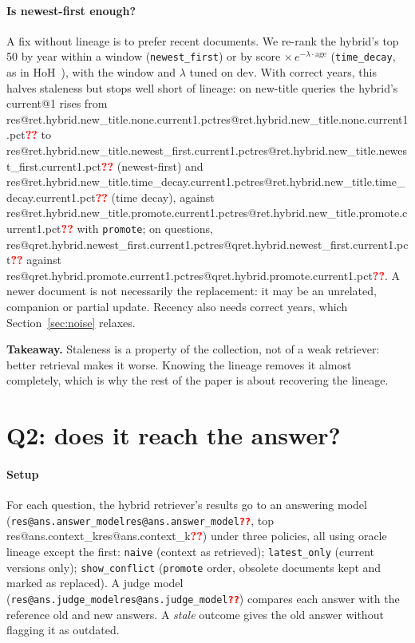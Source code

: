 \documentclass[11pt,a4paper]{article}
\makeatletter
\newcommand{\res}[1]{\ifcsname res@#1\endcsname\csname res@#1\endcsname\else\textcolor{red}{\textbf{??}}\fi}
\newcommand{\code}[1]{\texttt{\small #1}}
\newcommand{\status}[2]{%
  \par\vspace{-0.3em}{\sffamily\footnotesize
  \tcbox[on line,colback=#1!12,colframe=#1!12,boxrule=0pt,arc=6pt,
    left=4pt,right=4pt,top=1pt,bottom=1pt]{\textcolor{#1!70!black}{\textbf{#2}}}}\par\vspace{0.2em}}
\newcommand{\final}[1][final]{\status{aqua}{#1}}
\newcommand{\Takeaway}[1]{\begin{takeaway}\textsf{\textbf{\color{accent}Takeaway.}} #1\end{takeaway}}
\makeatother
\begin{document}
\paragraph{Is newest-first enough?} A fix without lineage is to prefer recent
documents. We re-rank the hybrid's top 50 by year within a window
(\code{newest\_first}) or by score $\times\,e^{-\lambda\cdot\text{age}}$
(\code{time\_decay}, as in HoH~\cite{ouyang2025hoh}), with the window and
$\lambda$ tuned on dev. With correct years, this halves staleness but stops well
short of lineage: on new-title queries the hybrid's current@1 rises from
\res{ret.hybrid.new_title.none.current1.pct} to
\res{ret.hybrid.new_title.newest_first.current1.pct} (newest-first) and
\res{ret.hybrid.new_title.time_decay.current1.pct} (time decay), against
\res{ret.hybrid.new_title.promote.current1.pct} with \code{promote}; on
questions, \res{qret.hybrid.newest_first.current1.pct} against
\res{qret.hybrid.promote.current1.pct}. A newer document is not necessarily the
replacement: it may be an unrelated, companion or partial update. Recency also
needs correct years, which Section~\ref{sec:noise} relaxes.

\Takeaway{Staleness is a property of the collection, not of a weak retriever:
better retrieval makes it worse. Knowing the lineage removes it almost completely,
which is why the rest of the paper is about recovering the lineage.}

\section{Q2: does it reach the answer?}\label{sec:answers}
\final[final · human check of the judge pending]

\paragraph{Setup} For each question, the hybrid retriever's results go to an
answering model (\code{\res{ans.answer_model}}, top \res{ans.context_k}) under
three policies, all using oracle lineage except the first:
\code{naive} (context as retrieved); \code{latest\_only} (current versions only);
\code{show\_conflict} (\code{promote} order, obsolete documents kept and marked as
replaced). A judge model (\code{\res{ans.judge_model}}) compares each answer with
the reference old and new answers. A \emph{stale} outcome gives the old answer
without flagging it as outdated.
\end{document}
